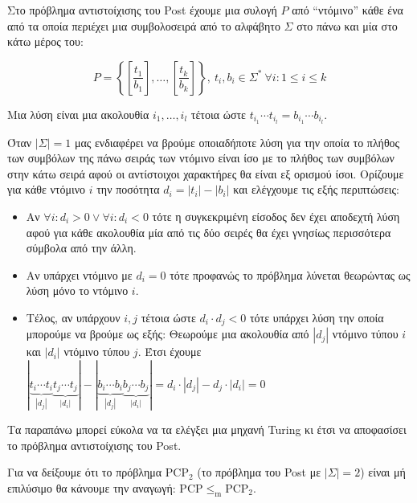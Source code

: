 \documentclass[a4paper, oneside, 11pt]{article}
\newcommand{\red}{\leq_{\text{m}}}
\theoremstyle{definition}
\begin{document}
Στο πρόβλημα αντιστοίχισης του Post έχουμε μια συλογή $P$ από ``ντόμινο'' κάθε ένα
από τα οποία περιέχει μια συμβολοσειρά από το αλφάβητο $\Sigma$ στο πάνω και μία στο
κάτω μέρος του:

\[ P = \left\{ \left[ \frac{t_1}{b_1} \right], \ldots, \left[ \frac{t_k}{b_k} \right]
\right\},\ t_i, b_i \in \Sigma^*\ \forall i: 1 \leq i \leq k \]

Μια λύση είναι μια ακολουθία $i_1, \ldots, i_l$ τέτοια ώστε $t_{i_1}\cdots
t_{i_l} = b_{i_1}\cdots b_{i_l}$.

Όταν $|\Sigma| = 1$ μας ενδιαφέρει να βρούμε οποιαδήποτε λύση για την οποία το πλήθος
των συμβόλων της πάνω σειράς των ντόμινο είναι ίσο με το πλήθος των συμβόλων στην
κάτω σειρά αφού οι αντίστοιχοι χαρακτήρες θα είναι εξ ορισμού ίσοι. Ορίζουμε για κάθε
ντόμινο $i$ την ποσότητα $d_i = |t_i| - |b_i|$ και ελέγχουμε τις εξής περιπτώσεις:

\begin{itemize}
\item Aν $\forall i: d_i > 0 \lor \forall i: d_i < 0$ τότε η συγκεκριμένη είσοδος δεν
      έχει αποδεχτή λύση αφού για κάθε ακολουθία μία από τις δύο σειρές θα έχει
      γνησίως περισσότερα σύμβολα από την άλλη.
\item Αν υπάρχει ντόμινο με $d_i = 0$ τότε προφανώς το πρόβλημα λύνεται
      θεωρώντας ως λύση μόνο το ντόμινο $i$.
\item Τέλος, αν υπάρχουν $i, j$ τέτοια ώστε $d_i \cdot d_j < 0$ τότε υπάρχει λύση
      την οποία μπορούμε να βρούμε ως εξής: Θεωρούμε μια ακολουθία από $|d_j|$ ντόμινο
      τύπου $i$ και $|d_i|$ ντόμινο τύπου $j$. Έτσι έχουμε
      $|\underbrace{t_i \cdots t_i}_{|d_j|}\underbrace{t_j \cdots t_j}_{|d_i|}|
      -|\underbrace{b_i \cdots b_i}_{|d_j|}\underbrace{b_j \cdots b_j}_{|d_i|}|
      = d_i\cdot|d_j| - d_j\cdot|d_i| = 0$
\end{itemize}

Τα παραπάνω μπορεί εύκολα να τα ελέγξει μια μηχανή Turing κι έτσι να αποφασίσει το
πρόβλημα αντιστοίχισης του Post.

Για να δείξουμε ότι το πρόβλημα $\text{PCP}_2$ (το πρόβλημα του Post με $|\Sigma| =
2$) είναι μή επιλύσιμο θα κάνουμε την αναγωγή: $\text{PCP} \red \text{PCP}_2$.
\end{document}
